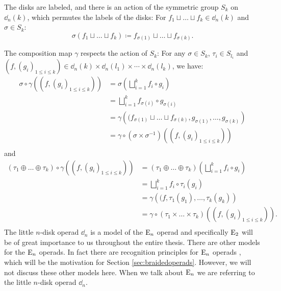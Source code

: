 \begin{egs}
\begin{enumerate}
            The disks are labeled, and there is an action of the symmetric group
            $S_k$ on $\dd_n(k)$, which permutes the labels of the disks: For
            $f_1 \sqcup \dots \sqcup f_k \in \dd_n(k)$ and $\sigma \in S_k$:
            \[
                \sigma (f_1 \sqcup \dots \sqcup f_k) \coloneqq f_{\sigma(1)} \sqcup \dots \sqcup f_{\sigma(k)}.
            \]

            The composition map $\gamma$ respects the action of $S_k$: For any
            $\sigma \in S_k$, $\tau_i \in S_{l_i}$ and $(f, (g_i)_{1 \leq i \leq
            k}) \in \dd_n(k) \times \dd_n(l_1) \times \cdots \times \dd_n(l_k)$,
            we have:
            \begin{align*}
                \sigma \circ \gamma ((f, (g_i)_{1 \leq i \leq k})) &= \sigma\left(\bigsqcup_{i=1}^k f_i \circ g_i \right) \\
                &= \bigsqcup_{i=1}^k f_{\sigma(i)}\circ g_{\sigma(i)} \\
                &= \gamma \left( (f_{\sigma(1)} \sqcup \dots \sqcup f_{\sigma(k)}, g_{\sigma(1)}, \dots, g_{\sigma(k)}\right) \\
                &= \gamma \circ (\sigma \times \sigma^{-1}) ((f, (g_i)_{1 \leq i \leq k})) \\
            \end{align*}
            and 
            \begin{align*}
                (\tau_1 \oplus \dots \oplus \tau_k) \circ \gamma ((f, (g_i)_{1 \leq i \leq k})) &= (\tau_1 \oplus \dots \oplus \tau_k) \left(\bigsqcup_{i=1}^k f_i \circ g_i \right) \\
                &= \bigsqcup_{i=1}^k f_i \circ {\tau_i(g_i)} \\
                &= \gamma \left( (f, \tau_1(g_1), \dots, \tau_k(g_k)\right) \\
                &= \gamma \circ (\tau_1 \times \dots \times \tau_k) ((f, (g_i)_{1 \leq i \leq k})). \\
            \end{align*}
            The little $n$-disk operad $\dd_n$ is a model of the $\operatorname{E}_n$ operad
            and specifically $\operatorname{E}_2$ will be of great importance to us throughout
            the entire thesis. There are other models for the $\operatorname{E}_n$ operads. In
            fact there are recognition principles for $\operatorname{E}_n$ operads \cite{EO},
            which will be the motivation for Section \ref{sec:braidedoperads}.
            However, we will not discuss these other models here. When we
            talk about $\operatorname{E}_n$ we are referring to the little $n$-disk operad
            $\dd_n$.
        \end{enumerate}
    \end{egs}

